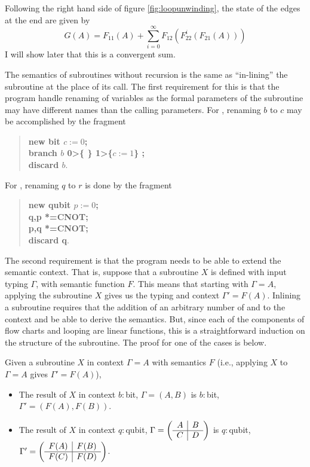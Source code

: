 Following the right hand side of figure \ref{fig:loopunwinding}, the state of the edges at the end
are given by
\begin{equation}
  G(A) = F_{11}(A)+\sum_{i=0}^{\infty}F_{12}(F^{i}_{22}(F_{21}(A)))\label{eqn:loopunwinding}
\end{equation}
I will show later that this is a convergent sum.

The semantics of subroutines without recursion is the same as ``in-lining'' the subroutine at the
place of its call. The first requirement for this is that the program handle renaming of variables
as the formal parameters of the subroutine may have different names than the calling parameters.
For \bits, renaming $b$ to $c$ may be accomplished by the fragment
\begin{quote}
  \textbf{new bit $c:=0$;\\  branch $b$ 0>\{ \} 1>\{$c:=1$\} ;\\
   discard $b$}.
\end{quote}
For \qbits, renaming $q$ to $r$ is done by the fragment
\begin{quote}
  \textbf{new qubit $p :=0$; \\
  q,p *=CNOT; \\
  p,q *=CNOT; \\
  discard q}.
\end{quote}
The second requirement is that the program needs to be able to extend the semantic context. That
is, suppose that a subroutine $X$ is defined with input typing $\Gamma$, with semantic function
$F$. This means that starting with $\Gamma=A$, applying the subroutine $X$ gives us the typing and
context $\Gamma'=F(A)$. Inlining a subroutine requires that the addition of an arbitrary number of
\bits and \qbits to the context and be able to derive the semantics. But, since each of the
components of flow charts and looping are linear functions, this is a straightforward induction on
the structure of the subroutine. The proof for one of the cases is below.
\begin{lemma}\label{lemma:contextextension}
Given a subroutine $X$ in context $\Gamma=A$ with semantics $F$ (i.e., applying $X$ to $\Gamma=A$
gives $\Gamma'=F(A)$),
\begin{itemize}
  \item{} The result of $X$ in context $b:$bit, $\Gamma=(A,B)$ is $b:$bit, $\Gamma'=(F(A),F(B))$.
  \item{} The result of $X$ in context $q:$qubit, $\Gamma=\qsmat{A}{B}{C}{D}$ is $q:$qubit, $\Gamma'=\qsmat{F(A)}{F(B)}{F(C)}{F(D)}$.
\end{itemize}
\end{lemma}
